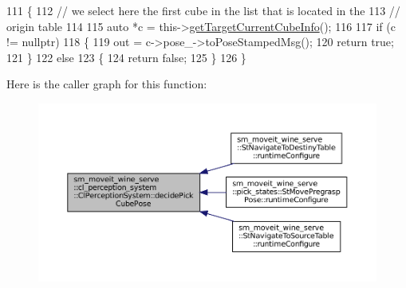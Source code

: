 \begin{DoxyCode}
111             \{
112                 \textcolor{comment}{// we select here the first cube in the list that is located in the}
113                 \textcolor{comment}{// origin table}
114 
115                 \textcolor{keyword}{auto} *c = this->\hyperlink{classsm__moveit__wine__serve_1_1cl__perception__system_1_1ClPerceptionSystem_a13bcd31217e9eda88d966d3ec142a465}{getTargetCurrentCubeInfo}();
116 
117                 \textcolor{keywordflow}{if} (c != \textcolor{keyword}{nullptr})
118                 \{
119                     out = c->pose\_->toPoseStampedMsg();
120                     \textcolor{keywordflow}{return} \textcolor{keyword}{true};
121                 \}
122                 \textcolor{keywordflow}{else}
123                 \{
124                     \textcolor{keywordflow}{return} \textcolor{keyword}{false};
125                 \}
126             \}
\end{DoxyCode}
Here is the caller graph for this function\+:
\nopagebreak
\begin{figure}[H]
\begin{center}
\leavevmode
\includegraphics[width=350pt]{classsm__moveit__wine__serve_1_1cl__perception__system_1_1ClPerceptionSystem_a18e4825d8729ff91f575442f14e507ee_icgraph}
\end{center}
\end{figure}
\mbox{\label{classsm__moveit__wine__serve_1_1cl__perception__system_1_1ClPerceptionSystem_a933bd942b37429d282180d19734aab85}} 
